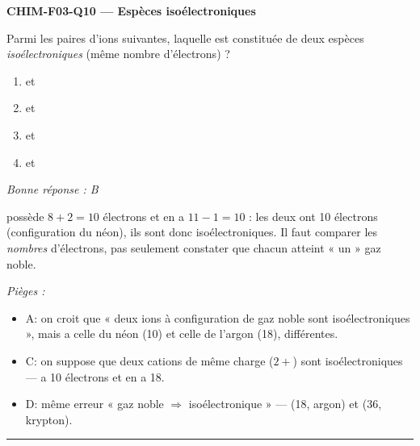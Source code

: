 \documentclass[11pt,a4paper]{article}
\begin{document}
\noindent\textbf{CHIM-F03-Q10 --- Espèces isoélectroniques}\par
Parmi les paires d'ions suivantes, laquelle est constituée de deux espèces \emph{isoélectroniques} (même nombre d'électrons) ?
\begin{enumerate}[label=\Alph*)]
\item {} et 
\item {} et 
\item {} et 
\item {} et 
\end{enumerate}
\textit{Bonne réponse : B}\par
{} possède $8+2 = 10$ électrons et  en a $11-1 = 10$ : les deux ont \num{10} électrons (configuration du néon), ils sont donc isoélectroniques. Il faut comparer les \emph{nombres} d'électrons, pas seulement constater que chacun atteint « un » gaz noble.\par
\textit{Pièges :}
\begin{itemize}
\item A: on croit que « deux ions à configuration de gaz noble sont isoélectroniques », mais  a celle du néon (\num{10}) et  celle de l'argon (\num{18}), différentes.
\item C: on suppose que deux cations de même charge ($2+$) sont isoélectroniques ---  a \num{10} électrons et  en a \num{18}.
\item D: même erreur « gaz noble $\Rightarrow$ isoélectronique » ---  (\num{18}, argon) et  (\num{36}, krypton).
\end{itemize}
\vspace{8pt}\hrule\vspace{8pt}
\end{document}
